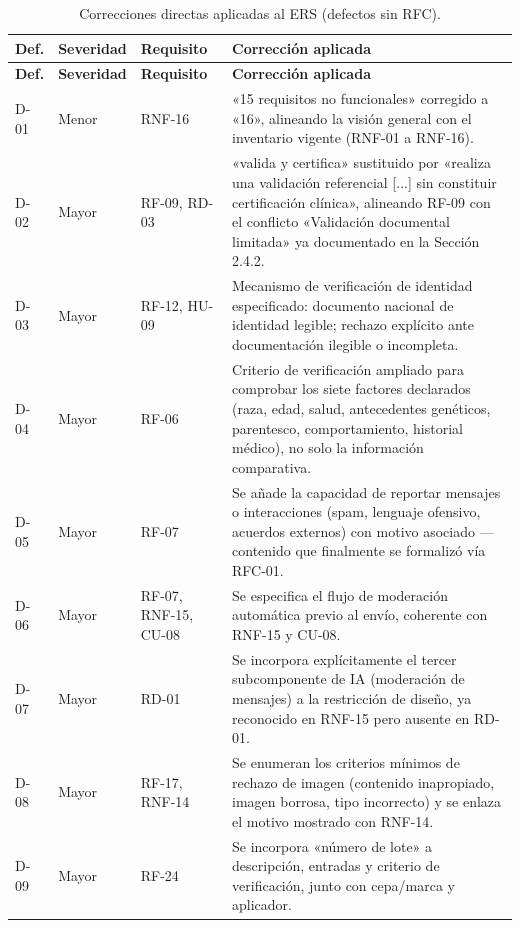 \documentclass[journal,onecolumn]{IEEEtran}
\begin{document}
\begin{longtable}{C{1.2cm} L{1.7cm} L{2.5cm} L{7cm}}
	\caption{Correcciones directas aplicadas al ERS (defectos sin RFC).}\label{tab:correcciones-directas}\\
	\toprule
	\textbf{Def.} & \textbf{Severidad} & \textbf{Requisito} & \textbf{Corrección aplicada} \\
	\midrule
	\endfirsthead
	\toprule
	\textbf{Def.} & \textbf{Severidad} & \textbf{Requisito} & \textbf{Corrección aplicada} \\
	\midrule
	\endhead
	\bottomrule
	\endfoot
	D-01 & Menor & RNF-16 & «15 requisitos no funcionales» corregido a «16», alineando la visión general con el inventario vigente (RNF-01 a RNF-16). \\
	\addlinespace
	D-02 & Mayor & RF-09, RD-03 & «valida y certifica» sustituido por «realiza una validación referencial [...] sin constituir certificación clínica», alineando RF-09 con el conflicto «Validación documental limitada» ya documentado en la Sección 2.4.2. \\
	\addlinespace
	D-03 & Mayor & RF-12, HU-09 & Mecanismo de verificación de identidad especificado: documento nacional de identidad legible; rechazo explícito ante documentación ilegible o incompleta. \\
	\addlinespace
	D-04 & Mayor & RF-06 & Criterio de verificación ampliado para comprobar los siete factores declarados (raza, edad, salud, antecedentes genéticos, parentesco, comportamiento, historial médico), no solo la información comparativa. \\
	\addlinespace
	D-05 & Mayor & RF-07 & Se añade la capacidad de reportar mensajes o interacciones (spam, lenguaje ofensivo, acuerdos externos) con motivo asociado --- contenido que finalmente se formalizó vía RFC-01. \\
	\addlinespace
	D-06 & Mayor & RF-07, RNF-15, CU-08 & Se especifica el flujo de moderación automática previo al envío, coherente con RNF-15 y CU-08. \\
	\addlinespace
	D-07 & Mayor & RD-01 & Se incorpora explícitamente el tercer subcomponente de IA (moderación de mensajes) a la restricción de diseño, ya reconocido en RNF-15 pero ausente en RD-01. \\
	\addlinespace
	D-08 & Mayor & RF-17, RNF-14 & Se enumeran los criterios mínimos de rechazo de imagen (contenido inapropiado, imagen borrosa, tipo incorrecto) y se enlaza el motivo mostrado con RNF-14. \\
	\addlinespace
	D-09 & Mayor & RF-24 & Se incorpora «número de lote» a descripción, entradas y criterio de verificación, junto con cepa/marca y aplicador. \\

\end{longtable}
\end{document}
